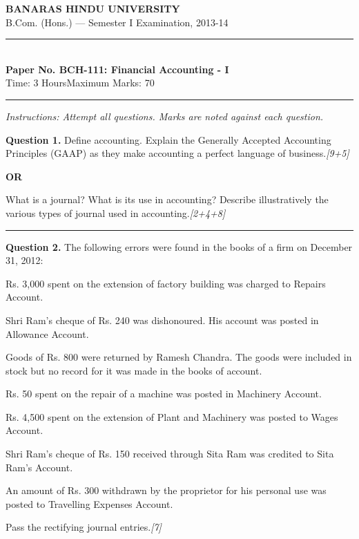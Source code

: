 \documentclass[11pt,a4paper]{article}
\newcommand{\pts}[1]{\hfill   \textit{[#1]}}
\begin{document}
\begin{center}
  {\large\bfseries BANARAS HINDU UNIVERSITY}\\[2pt]
  {\normalsize B.Com. (Hons.) --- Semester I Examination, 2013-14}\\[6pt]
  \rule{0.8\linewidth}{0.5pt}\\[6pt]
  {\large\bfseries Paper No. BCH-111: Financial Accounting - I}\\[4pt]
  {\normalsize Time: 3 Hours\hfill Maximum Marks: 70}
\end{center}

\rule{\linewidth}{0.4pt}

\smallskip



\noindent   \textit{Instructions: Attempt all questions. Marks are noted against each question.}

\bigskip




\noindent   \textbf{Question 1.}
Define accounting. Explain the Generally Accepted Accounting Principles (GAAP) as they make accounting a perfect language of business.\pts{9+5}

\centerline{   \textbf{OR}}

What is a journal? What is its use in accounting? Describe illustratively the various types of journal used in accounting.\pts{2+4+8}

\medskip\rule{\linewidth}{0.2pt}




\noindent   \textbf{Question 2.}
The following errors were found in the books of a firm on December 31, 2012:

\begin{parts}
  \item Rs. 3,000 spent on the extension of factory building was charged to Repairs Account.
  \item Shri Ram's cheque of Rs. 240 was dishonoured. His account was posted in Allowance Account.
  \item Goods of Rs. 800 were returned by Ramesh Chandra. The goods were included in stock but no record for it was made in the books of account.
  \item Rs. 50 spent on the repair of a machine was posted in Machinery Account.
  \item Rs. 4,500 spent on the extension of Plant and Machinery was posted to Wages Account.
  \item Shri Ram's cheque of Rs. 150 received through Sita Ram was credited to Sita Ram's Account.
  \item An amount of Rs. 300 withdrawn by the proprietor for his personal use was posted to Travelling Expenses Account.
\end{parts}
Pass the rectifying journal entries.\pts{7}
\end{document}
